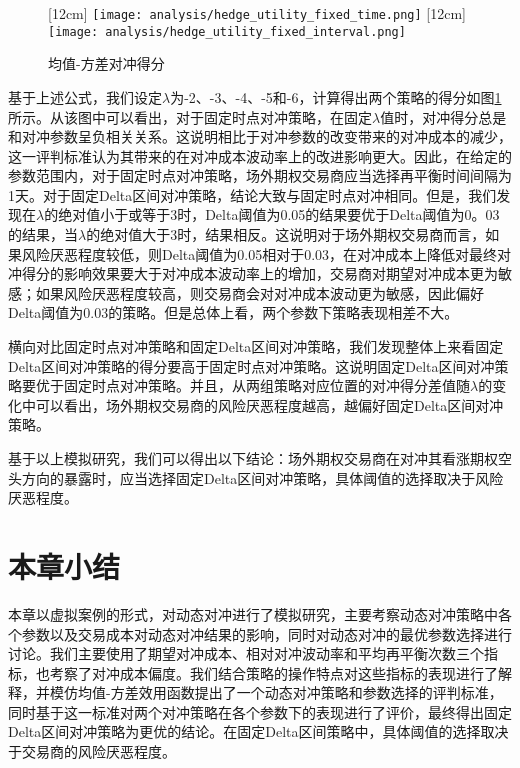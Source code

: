 \begin{figure}[htb]
  \centering
  [12cm]
    {\texttt{[image: analysis/hedge\_utility\_fixed\_time.png]}}
  \hspace{0.5cm}
  [12cm]
    {\texttt{[image: analysis/hedge\_utility\_fixed\_interval.png]}}
    \caption[这里将出现在插图索引中]
    {均值-方差对冲得分}
  \label{fig:hedge_utility}
\end{figure}

基于上述公式，我们设定$\lambda$为-2、-3、-4、-5和-6，计算得出两个策略的得分如图\ref{fig:hedge_utility}所示。从该图中可以看出，对于固定时点对冲策略，在固定$\lambda$值时，对冲得分总是和对冲参数呈负相关关系。这说明相比于对冲参数的改变带来的对冲成本的减少，这一评判标准认为其带来的在对冲成本波动率上的改进影响更大。因此，在给定的参数范围内，对于固定时点对冲策略，场外期权交易商应当选择再平衡时间间隔为1天。对于固定Delta区间对冲策略，结论大致与固定时点对冲相同。但是，我们发现在$\lambda$的绝对值小于或等于3时，Delta阈值为0.05的结果要优于Delta阈值为0。03的结果，当$\lambda$的绝对值大于3时，结果相反。这说明对于场外期权交易商而言，如果风险厌恶程度较低，则Delta阈值为0.05相对于0.03，在对冲成本上降低对最终对冲得分的影响效果要大于对冲成本波动率上的增加，交易商对期望对冲成本更为敏感；如果风险厌恶程度较高，则交易商会对对冲成本波动更为敏感，因此偏好Delta阈值为0.03的策略。但是总体上看，两个参数下策略表现相差不大。

横向对比固定时点对冲策略和固定Delta区间对冲策略，我们发现整体上来看固定Delta区间对冲策略的得分要高于固定时点对冲策略。这说明固定Delta区间对冲策略要优于固定时点对冲策略。并且，从两组策略对应位置的对冲得分差值随$\lambda$的变化中可以看出，场外期权交易商的风险厌恶程度越高，越偏好固定Delta区间对冲策略。

基于以上模拟研究，我们可以得出以下结论：场外期权交易商在对冲其看涨期权空头方向的暴露时，应当选择固定Delta区间对冲策略，具体阈值的选择取决于风险厌恶程度。

\section{本章小结}

本章以虚拟案例的形式，对动态对冲进行了模拟研究，主要考察动态对冲策略中各个参数以及交易成本对动态对冲结果的影响，同时对动态对冲的最优参数选择进行讨论。我们主要使用了期望对冲成本、相对对冲波动率和平均再平衡次数三个指标，也考察了对冲成本偏度。我们结合策略的操作特点对这些指标的表现进行了解释，并模仿均值-方差效用函数提出了一个动态对冲策略和参数选择的评判标准，同时基于这一标准对两个对冲策略在各个参数下的表现进行了评价，最终得出固定Delta区间对冲策略为更优的结论。在固定Delta区间策略中，具体阈值的选择取决于交易商的风险厌恶程度。
